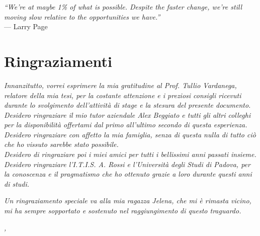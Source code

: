 
\cleardoublepage
{}
{}

\begin{flushright}{
	\slshape    
	``We're at maybe 1\% of what is possible. Despite the faster change, we're
	still moving slow relative to the opportunities we have.''} \\ 
	\medskip
    --- Larry Page
\end{flushright}


\bigskip

\begingroup
\let\clearpage\relax
\let\cleardoublepage\relax
\let\cleardoublepage\relax

\chapter*{Ringraziamenti}

\noindent \textit{Innanzitutto, vorrei esprimere la mia gratitudine al Prof.
Tullio Vardanega, relatore della mia tesi, per la costante attenzione e i
preziosi consigli ricevuti durante lo svolgimento dell'attività di stage e la
stesura del presente documento.}\\

\noindent \textit{Desidero ringraziare il mio tutor aziendale Alex Beggiato e
tutti gli altri colleghi per la disponibilità offertami dal primo all'ultimo
secondo di questa esperienza.}\\

\noindent \textit{Desidero ringraziare con affetto la mia famiglia, senza di
questa nulla di tutto ciò che ho vissuto sarebbe stato possibile.}\\

\noindent \textit{Desidero di ringraziare poi i miei amici per tutti i
bellissimi anni passati insieme.}\\

\noindent \textit{Desidero ringraziare l'I.T.I.S. A. Rossi e l'Università degli
Studi di Padova, per la conoscenza e il pragmatismo che ho ottenuto grazie a
loro durante questi anni di studi.}\\
\bigskip
\bigskip
\bigskip

\noindent \emph{Un ringraziamento speciale va alla mia ragazza Jelena, che mi
è rimasta vicino, mi ha sempre sopportato e sostenuto nel raggiungimento di
questo traguardo.}

\bigskip
\bigskip

\noindent\textit{\myLocation, \myTime}
\hfill \myName

\endgroup

